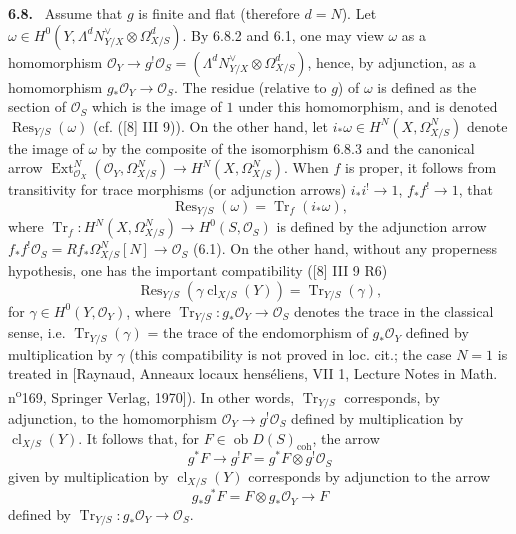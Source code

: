 \documentclass[11pt]{article}
\newenvironment{statement}[1]{\par\medskip\noindent\textbf{#1.}\ }{\par\medskip}
\DeclareMathOperator{\Ext}{Ext}
\newcommand{\ob}{\operatorname{ob}}
\providecommand{\cl}{\operatorname{cl}}
\providecommand{\Tr}{\operatorname{Tr}}
\providecommand{\coh}{\mathrm{coh}}
\providecommand{\OO}{\mathcal O}
\providecommand{\Res}{\operatorname{Res}}
\begin{document}
\begin{statement}{6.8}
Assume that $g$ is finite and flat (therefore $d=N$). Let $\omega\in H^0(Y,\Lambda^dN^\vee_{Y/X}\otimes\Omega^d_{X/S})$. By 6.8.2 and 6.1, one may view $\omega$ as a homomorphism $\OO_Y\to g^!\OO_S=(\Lambda^dN^\vee_{Y/X}\otimes\Omega^d_{X/S})$, hence, by adjunction, as a homomorphism $g_*\OO_Y\to\OO_S$. The residue (relative to $g$) of $\omega$ is defined as the section of $\OO_S$ which is the image of $1$ under this homomorphism, and is denoted $\Res_{Y/S}(\omega)$ (cf. ([8] III 9)). On the other hand, let $i_*\omega\in H^N(X,\Omega^N_{X/S})$ denote the image of $\omega$ by the composite of the isomorphism 6.8.3 and the canonical arrow $\Ext^N_{\OO_X}(\OO_Y,\Omega^N_{X/S})\to H^N(X,\Omega^N_{X/S})$. When $f$ is proper, it follows from transitivity for trace morphisms (or adjunction arrows) $i_*i^!\to 1$, $f_*f^!\to 1$, that
\begin{equation}
\tag{6.8.4}
\Res_{Y/S}(\omega)=\Tr_f(i_*\omega),
\end{equation}
where $\Tr_f:H^N(X,\Omega^N_{X/S})\to H^0(S,\OO_S)$ is defined by the adjunction arrow $f_*f^!\OO_S=Rf_*\Omega^N_{X/S}[N]\to\OO_S$ (6.1). On the other hand, without any properness hypothesis, one has the important compatibility ([8] III 9 R6)
\begin{equation}
\tag{6.8.5}
\Res_{Y/S}(\gamma\cl_{X/S}(Y))=\Tr_{Y/S}(\gamma),
\end{equation}
for $\gamma\in H^0(Y,\OO_Y)$, where $\Tr_{Y/S}:g_*\OO_Y\to\OO_S$ denotes the trace in the classical sense, i.e. $\Tr_{Y/S}(\gamma)$ = the trace of the endomorphism of $g_*\OO_Y$ defined by multiplication by $\gamma$ (this compatibility is not proved in loc. cit.; the case $N=1$ is treated in [Raynaud, Anneaux locaux henséliens, VII 1, Lecture Notes in Math. n\textsuperscript{o}169, Springer Verlag, 1970]). In other words, $\Tr_{Y/S}$ corresponds, by adjunction, to the homomorphism $\OO_Y\to g^!\OO_S$ defined by multiplication by $\cl_{X/S}(Y)$. It follows that, for $F\in\ob D(S)_{\coh}$, the arrow
\begin{equation}
\tag{6.8.6}
g^*F\longrightarrow g^!F=g^*F\otimes g^!\OO_S
\end{equation}
given by multiplication by $\cl_{X/S}(Y)$ corresponds by adjunction to the arrow
\begin{equation}
\tag{6.8.7}
g_*g^*F=F\otimes g_*\OO_Y\longrightarrow F
\end{equation}
defined by $\Tr_{Y/S}:g_*\OO_Y\to\OO_S$.
\end{statement}
\end{document}
